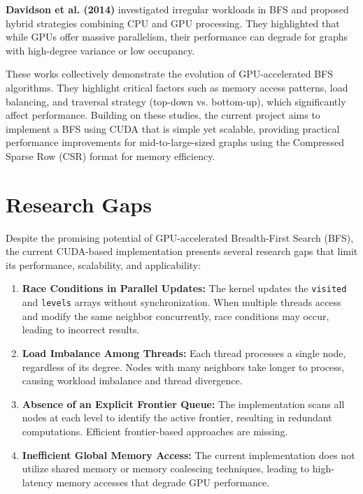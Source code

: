 \documentclass[a4paper,12pt]{article}
\begin{document}
\begin{center}
\textbf{Davidson et al. (2014)} investigated irregular workloads in BFS and proposed hybrid strategies combining CPU and GPU processing. They highlighted that while GPUs offer massive parallelism, their performance can degrade for graphs with high-degree variance or low occupancy.

These works collectively demonstrate the evolution of GPU-accelerated BFS algorithms. They highlight critical factors such as memory access patterns, load balancing, and traversal strategy (top-down vs. bottom-up), which significantly affect performance. Building on these studies, the current project aims to implement a BFS using CUDA that is simple yet scalable, providing practical performance improvements for mid-to-large-sized graphs using the Compressed Sparse Row (CSR) format for memory efficiency.


\newpage
\section*{Research Gaps}

Despite the promising potential of GPU-accelerated Breadth-First Search (BFS), the current CUDA-based implementation presents several research gaps that limit its performance, scalability, and applicability:

\begin{enumerate}
    \item \textbf{Race Conditions in Parallel Updates:} The kernel updates the \texttt{visited} and \texttt{levels} arrays without synchronization. When multiple threads access and modify the same neighbor concurrently, race conditions may occur, leading to incorrect results.

    \item \textbf{Load Imbalance Among Threads:} Each thread processes a single node, regardless of its degree. Nodes with many neighbors take longer to process, causing workload imbalance and thread divergence.

    \item \textbf{Absence of an Explicit Frontier Queue:} The implementation scans all nodes at each level to identify the active frontier, resulting in redundant computations. Efficient frontier-based approaches are missing.

    \item \textbf{Inefficient Global Memory Access:} The current implementation does not utilize shared memory or memory coalescing techniques, leading to high-latency memory accesses that degrade GPU performance.


\end{enumerate}
\end{center}
\end{document}
